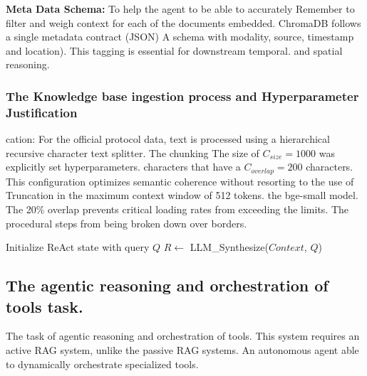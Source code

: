 \documentclass[conference]{IEEEtran}
\begin{document}
\textbf{Meta Data Schema:} To help the agent to be able to accurately Remember to filter and weigh context for each of the documents embedded. ChromaDB follows a single metadata contract (JSON) A schema with modality, source, timestamp and location). This tagging is essential for downstream temporal. and spatial reasoning.

\subsubsection{The Knowledge base ingestion process and Hyperparameter Justification}
cation: For the official protocol data, text is processed using a hierarchical recursive character text splitter. The chunking The size of $C_{size} = 1000$ was explicitly set hyperparameters. characters that have a $C_{overlap} = 200$ characters. This configuration optimizes semantic coherence without resorting to the use of Truncation in the maximum context window of 512 tokens. the bge-small model. The 20\% overlap prevents critical loading rates from exceeding the limits. The procedural steps from being broken down over borders.

\begin{algorithm}[htbp]
\caption{Agentic API Execution \& Fault Tolerance Loop}
\label{alg:fallback}
\SetAlgoLined
{}
 Initialize ReAct state with query $Q$\;
 $R \leftarrow$ LLM\_Synthesize($Context$, $Q$)\;
 \;
\end{algorithm}

\subsection{The agentic reasoning and orchestration of tools task.}
The task of agentic reasoning and orchestration of tools. This system requires an active RAG system, unlike the passive RAG systems. An autonomous agent able to dynamically orchestrate specialized tools.
\end{document}
